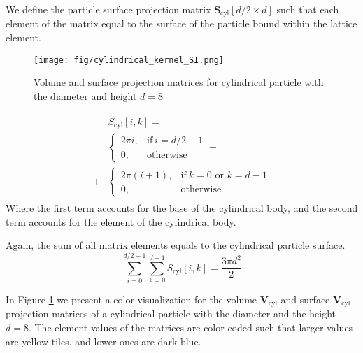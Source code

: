 \documentclass[10pt, a4paper]{article}
\begin{document}
\begin{multicols}{2}
We define the particle surface projection matrix  $\mathbf{S}_{\textrm{cyl}}[d/2 \times d]$ such that each element of the matrix equal to the surface of the particle bound within the lattice element.

\begin{figure}[H]
    \centering
    \texttt{[image: fig/cylindrical\_kernel\_SI.png]}
    \caption{Volume and surface projection matrices for cylindrical particle with the diameter and height $d=8$}
    \label{fig:cylindrical_kernel_SI}
\end{figure}

\begin{align}
    \begin{split}
        &S_{\textrm{cyl}}[i,k] = 
        \\
        &\begin{cases}
            2 \pi i,   & \text{if}\ i=d/2-1 \\
            0,         & \text{otherwise}
        \end{cases}
    +
    \\
    +
    &\begin{cases}
        2\pi(i+1), & \text{if}\ k=0 \text{ or } k=d-1 \\
        0,         & \text{otherwise}
    \end{cases}
\end{split}
\end{align}
Where the first term accounts for the base of the cylindrical body, and the second term accounts for the element of the cylindrical body.

Again, the sum of all matrix elements equals to the cylindrical particle surface.
\begin{equation}
    \sum_{i=0}^{d/2-1} \sum_{k=0}^{d-1} S_{\textrm{cyl}}[i, k] = \frac{3 \pi d^2}{2}
\end{equation}

In Figure \ref{fig:cylindrical_kernel_SI} we present a color visualization for the volume $\mathbf{V}_{\textrm{cyl}}$ and surface $\mathbf{V}_{\textrm{cyl}}$ projection matrices of a cylindrical particle with the diameter and the height $d=8$.
The element values of the matrices are color-coded such that larger values are yellow tiles, and lower ones are dark blue.


\end{multicols}
\end{document}

